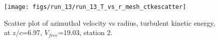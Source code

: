 \begin{figure}[H]
\centering
\texttt{[image: figs/run\_13/run\_13\_T\_vs\_r\_mesh\_ctkescatter]}
\caption{Scatter plot of azimuthal velocity vs radius, turbulent kinetic energy, at $z/c$=6.97, $V_{free}$=19.03, station 2.}
\label{fig:run_13_T_vs_r_mesh_ctkescatter}
\end{figure}


